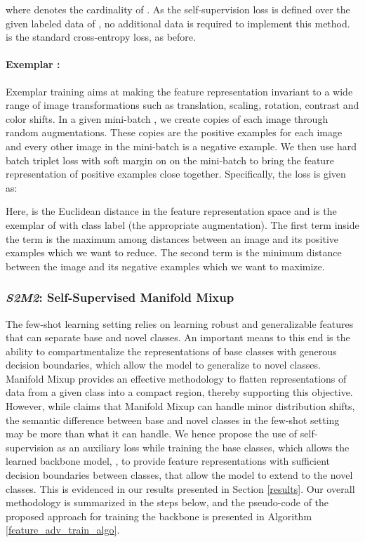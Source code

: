 \documentclass[10pt,twocolumn,letterpaper]{article}
\begin{document}
\noindent where  denotes the cardinality of . As the self-supervision loss is defined over the given labeled data of , no additional data is required to implement this method.  is the standard cross-entropy loss, as before.

\paragraph{Exemplar \cite{exemplar2014}:}
Exemplar training aims at making the feature representation invariant to a wide range of image transformations such as translation, scaling, rotation, contrast and color shifts. In a given mini-batch , we create  copies of each image through random augmentations. These  copies are the positive examples for each image and every other image in the mini-batch is a negative example. We then use hard batch triplet loss  \cite{hardbatchtripletloss} with soft margin on  on the mini-batch to bring the feature representation of positive examples close together. Specifically, the loss is given as:

Here,  is the Euclidean distance in the feature representation space  and  is the  exemplar of  with class label  (the appropriate augmentation). The first term inside the  term is the maximum among distances between an image and its positive examples which we want to reduce. The second term is the minimum distance between the image and its negative examples which we want to maximize. 
\subsubsection{\textit{S2M2}: Self-Supervised Manifold Mixup}
\label{ourapproach}
The few-shot learning setting relies on learning robust and generalizable features that can separate base and novel classes. An important means to this end is the ability to compartmentalize the representations of base classes with generous decision boundaries, which allow the model to generalize to novel classes. Manifold Mixup provides an effective methodology to flatten representations of data from a given class into a compact region, thereby supporting this objective. However, while \cite{verma2019manifold} claims that Manifold Mixup can handle minor distribution shifts, the semantic difference between base and novel classes in the few-shot setting may be more than what it can handle. We hence propose the use of self-supervision as an auxiliary loss while training the base classes, which allows the learned backbone model, , to provide feature representations with sufficient decision boundaries between classes, that allow the model to extend to the novel classes. This is evidenced in our results presented in Section \ref{results}. Our overall methodology is summarized in the steps below, and the pseudo-code of the proposed approach for training the backbone is presented in Algorithm \ref{feature_adv_train_algo}.
\end{document}
